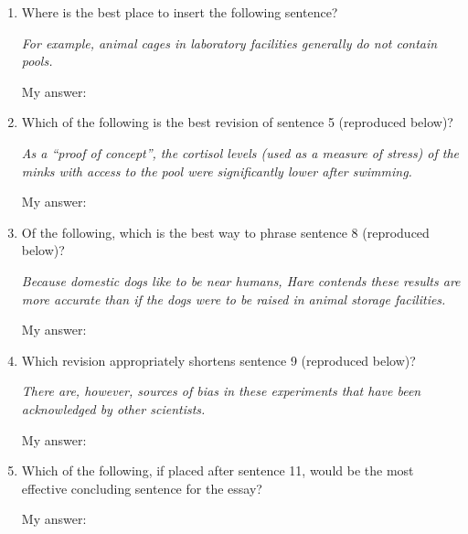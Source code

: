 \begin{enumerate}
\item Where is the best place to insert the following sentence?

\textit{For example, animal cages in laboratory facilities generally do not contain pools.}

My answer: \hrulefill

\vfill

\item Which of the following is the best revision of sentence 5 (reproduced below)?

\textit{As a ``proof of concept'', the cortisol levels (used as a measure of stress) of the minks with access to the pool were significantly lower after swimming.}

My answer: \hrulefill

\vfill

\item Of the following, which is the best way to phrase sentence 8 (reproduced below)?

\textit{Because domestic dogs like to be near humans, Hare contends these results are more accurate than if the dogs were to be raised in animal storage facilities.}

My answer: \hrulefill

\vfill

\item Which revision appropriately shortens sentence 9 (reproduced below)?

\textit{There are, however, sources of bias in these experiments that have been acknowledged by other scientists.}

My answer: \hrulefill

\vfill

\item Which of the following, if placed after sentence 11, would be the most effective concluding sentence for the essay?

My answer: \hrulefill
\end{enumerate}